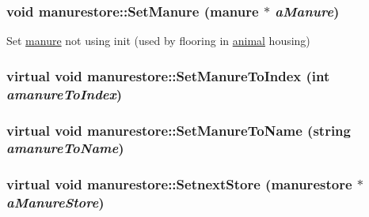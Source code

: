 \label{classmanurestore_abffbe2e19e1d1ad114f35c532acc3f4c}
\hypertarget{classmanurestore_a613b4feef4fa58c5586b6d9e0dd2a723}{
\subsubsection[{SetManure}]{\setlength{\rightskip}{0pt plus 5cm}void manurestore::SetManure ({\bf manure} $\ast$ {\em aManure})}}
\label{classmanurestore_a613b4feef4fa58c5586b6d9e0dd2a723}
Set \hyperlink{classmanure}{manure} not using init (used by flooring in \hyperlink{classanimal}{animal} housing) \hypertarget{classmanurestore_a91a0524f1b0d04fcb00e04a5d271050b}{
\subsubsection[{SetManureToIndex}]{\setlength{\rightskip}{0pt plus 5cm}virtual void manurestore::SetManureToIndex (int {\em amanureToIndex})}}
\label{classmanurestore_a91a0524f1b0d04fcb00e04a5d271050b}
\hypertarget{classmanurestore_a1059b3c5134aedbee070b852792a2208}{
\subsubsection[{SetManureToName}]{\setlength{\rightskip}{0pt plus 5cm}virtual void manurestore::SetManureToName (string {\em amanureToName})}}
\label{classmanurestore_a1059b3c5134aedbee070b852792a2208}
\hypertarget{classmanurestore_a17d1969c7d7f39b449da52d42155f342}{
\subsubsection[{SetnextStore}]{\setlength{\rightskip}{0pt plus 5cm}virtual void manurestore::SetnextStore ({\bf manurestore} $\ast$ {\em aManureStore})}}
